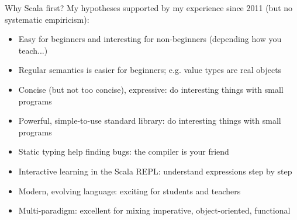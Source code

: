 \documentclass[aspectratio=169]{beamer}
\newenvironment{Slide}[1]%
  {\begin{frame}[environment=Slide]{#1}}
  {\end{frame}}%
\begin{document}

\begin{Slide}{Why Scala first?}
  My hypotheses supported by my experience since 2011 (but no systematic empiricism):
  \begin{itemize}
  \item Easy for beginners and interesting for non-beginners (depending how you teach...)
  \item Regular semantics is easier for beginners; e.g. value types are real objects
  \item Concise (but not too concise), expressive: do interesting things with small programs
  \item Powerful, simple-to-use standard library: do interesting things with small programs
  \item Static typing help finding bugs: the compiler is your friend
  \item Interactive learning in the Scala REPL: understand expressions step by step
  \item Modern, evolving language: exciting for students and teachers
  \item Multi-paradigm: excellent for mixing imperative, object-oriented, functional
  \end{itemize}  
\end{Slide}
\end{document}
